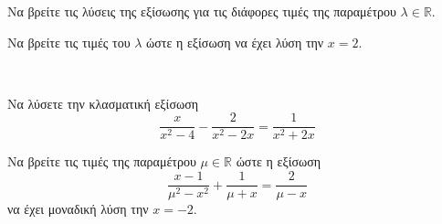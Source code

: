 \documentclass[11pt,a4paper]{article}
\begin{document}
\begin{thema}
\begin{erwthma}
\item Να βρείτε τις λύσεις της εξίσωσης για τις διάφορες τιμές της παραμέτρου $\lambda\in\mathbb{R}$.
\item Να βρείτε τις τιμές του $\lambda$ ώστε η εξίσωση να έχει λύση την $x=2$.
\end{erwthma}
\item\mbox{}\\\vspace{-7mm}
\begin{erwthma}
\item Να λύσετε την κλασματική εξίσωση
\[ \frac{x}{x^2-4}-\frac{2}{x^2-2x}=\frac{1}{x^2+2x} \]
\item Να βρείτε τις τιμές της παραμέτρου $\mu\in\mathbb{R}$ ώστε η εξίσωση
\[ \frac{x-1}{\mu^2-x^2}+\frac{1}{\mu+x}=\frac{2}{\mu-x} \]
να έχει μοναδική λύση την $x=-2$.
\end{erwthma}
\end{thema}
\end{document}
